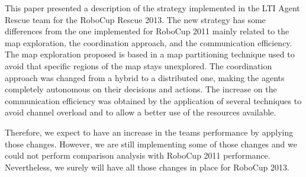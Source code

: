 This paper presented a description of the strategy implemented in the LTI Agent Rescue team for the RoboCup Rescue 2013. The new strategy has some differences from the one implemented for RoboCup 2011 mainly related to the map exploration, the coordination approach, and the communication efficiency. The map exploration proposed is based in a map partitioning technique used to avoid that specific regions of the map stays unexplored. The coordination approach was changed from a hybrid to a distributed one, making the agents completely autonomous on their decisions and actions. The increase on the communication efficiency was obtained by the application of several techniques to avoid channel overload and to allow a better use of the resources available.

Therefore, we expect to have an increase in the teams performance by applying those changes. However, we are still implementing some of those changes and we could not perform comparison analysis with RoboCup 2011 performance. Nevertheless, we surely will have all those changes in place for RoboCup 2013.
